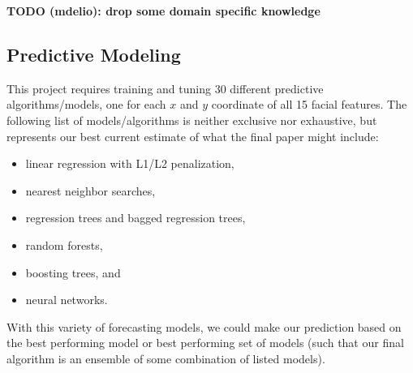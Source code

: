 \documentclass[conference]{IEEEtran}
\begin{document}
\textbf{TODO (mdelio): drop some domain specific knowledge}

\subsection{Predictive Modeling}
This project requires training and tuning 30 different predictive algorithms/models, one for each $x$ and $y$ coordinate of all 15 facial features. The following list of models/algorithms is neither exclusive nor exhaustive, but represents our best current estimate of what the final paper might include:
\begin{itemize}
\item linear regression with L1/L2 penalization,
\item nearest neighbor searches,
\item regression trees and bagged regression trees,
\item random forests,
\item boosting trees, and
\item neural networks.
\end{itemize}
With this variety of forecasting models, we could make our prediction based on the best performing model or best performing set of models (such that our final algorithm is an ensemble of some combination of listed models).
\end{document}
